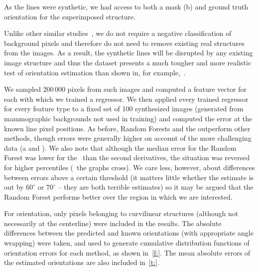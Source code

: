 As the lines were synthetic, we had access to both a mask (b) and ground truth orientation for the superimposed structure.

Unlike other similar studies~\cite{Berks_etal_IPMI11}, we do not require a negative classification of background pixels and therefore do not need to remove existing real structures from the images. As a result, the synthetic lines will be disrupted by any existing image structure and thus the dataset presents a much tougher and more realistic test of orientation estimation than shown in, for example,~\cite{Berks_etal_IPMI11}.

We sampled 200\,000 pixels from such images and computed a feature vector for each with which we trained a regressor. We then applied every trained regressor for every feature type to a fixed set of 100 synthesized images (generated from mammographic backgrounds not used in training) and computed the error at the known line pixel positions. As before, Random Forests and the \dtcwt{} outperform other methods, though errors were generally higher on account of the more challenging data (a and ). We also note that although the median error for the Random Forest was lower for the \dtcwt~than the second derivatives, the situation was reversed for higher percentiles (\ie~the graphs cross). We care less, however, about differences between errors above a certain threshold (it matters little whether the estimate is out by $60^\circ$ or $70^\circ$ -- they are both terrible estimates) so it may be argued that the Random Forest performs better over the region in which we are interested.

For orientation, only pixels belonging to curvilinear structures (although not necessarily at the centerline) were included in the results. The absolute differences between the predicted and known orientations (with appropriate angle wrapping) were taken, and used to generate cumulative distribution functions of orientation errors for each method, as shown in~\ref{f:}. The mean absolute errors of the estimated orientations are also included in~\ref{t:}.

%
%
%

